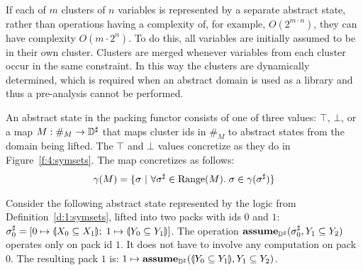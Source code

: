 If each of $m$ clusters of $n$ variables is represented by a separate abstract state, rather than operations having a complexity of, for example, $O(2^{m\cdot n})$, they can have complexity $O(m\cdot 2^n)$.  To do this, all variables are initially assumed to be in their own cluster.  Clusters are merged whenever variables from each cluster occur in the same constraint.  In this way the clusters are dynamically determined, which is required when an abstract domain is used as a library and thus a pre-analysis cannot be performed.

An abstract state in the packing functor consists of one of three values: $\top$, $\bot$, or a map $M : \#_M \rightarrow {\mathbb{D}}^{\sharp}$ that maps cluster ids in $\#_M$ to abstract states from the domain being lifted.  The $\top$ and $\bot$ values concretize as they do in Figure~\ref{f:4:symsets}.  The map concretizes as follows:
\begin{align*}
  \gamma(M) = \{ \sigma \ | \ \forall {\sigma}^{\sharp} \in \textrm{Range}(M). \; \sigma \in \gamma({\sigma}^{\sharp}) \}
\end{align*}

\begin{example}
Consider the following abstract state represented by the logic from Definition~\ref{d:1:symsets}, lifted into two packs with ids $0$ and $1$:
$
  {\sigma}^{\sharp}_0 = [0 \mapsto \llparenthesis X_0 \subseteq X_1 \rrparenthesis; \; 1 \mapsto \llparenthesis Y_0 \subseteq Y_1 \rrparenthesis ]
$.
The operation $\textbf{assume}_{{\mathbb{D}}^{\sharp}}({\sigma}^{\sharp}_0, Y_1 \subseteq Y_2)$ operates only on pack id $1$.  It does not have to involve any computation on pack $0$.  The resulting pack $1$ is: $1 \mapsto \textbf{assume}_{{\mathbb{D}}^{\sharp}}(\llparenthesis Y_0 \subseteq Y_1 \rrparenthesis, Y_1 \subseteq Y_2)$.
\end{example}
